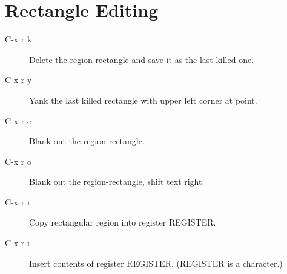 
\chapter{Rectangle Editing}

\begin{description}
\item[C-x r k] Delete the region-rectangle and save it as the last killed one.
\item[C-x r y] Yank the last killed rectangle with upper left corner at point.
\item[C-x r c] Blank out the region-rectangle.
\item[C-x r o] Blank out the region-rectangle, shift text right.
\item[C-x r r] Copy rectangular region into register REGISTER.
\item[C-x r i] Insert contents of register REGISTER. (REGISTER is a character.)
\end{description}